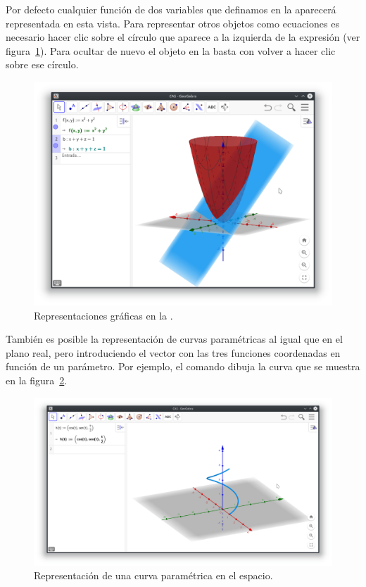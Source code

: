 Por defecto cualquier función de dos variables que definamos en la  aparecerá representada en esta vista.
Para representar otros objetos como ecuaciones es necesario hacer clic sobre el círculo que aparece a la izquierda de la expresión (ver figura~\ref{g:vista-grafica-3D}).
Para ocultar de nuevo el objeto en la  basta con volver a hacer clic sobre ese círculo.

\begin{figure}[h!]
\begin{center}
\includegraphics[width=\textwidth]{img/introduccion/3D-graphic-view}
\caption{Representaciones gráficas en la .} \label{g:vista-grafica-3D}
\end{center}
\end{figure}

También es posible la representación de curvas paramétricas al igual que en el plano real, pero introduciendo el vector con las tres funciones coordenadas en función de un parámetro.
Por ejemplo, el comando  dibuja la curva que se muestra en la figura~\ref{g:curva-parametrica-3D}.

\begin{figure}[h!]
\begin{center}
\includegraphics[width=\textwidth]{img/introduccion/3D-parametric-curve}
\caption{Representación de una curva paramétrica en el espacio.} \label{g:curva-parametrica-3D}
\end{center}
\end{figure}

